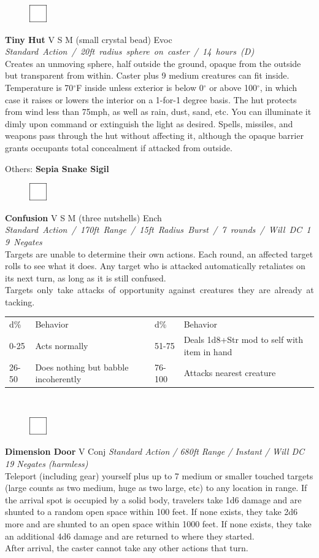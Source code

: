 \documentclass[letterpaper]{article}
\newcommand{\colhead}[0]{\footnotesize\itshape}
\newcommand{\e}[1]{\emph{#1}}
\newcommand{\B}[1]{\textbf{#1}}
\newcommand{\spell}[7]{
\begin{figure}
\vspace{-13pt}
\ifstrequal{#2}{Full}{  \includegraphics[width=2em]{Checkbox-Full}}{
\ifstrequal{#2}{Scroll}{\includegraphics[width=2em]{Checkbox-S}}{
                        \includegraphics[width=2em]{Checkbox}}}
\ifstrequal{#7}{}{\vspace{-1em}}{\vspace{#7}}
\end{figure}
 \B{#1} #3 {
    \ifstrequal{#4}{Conj}{\color{Plum}Conj}{%
    \ifstrequal{#4}{Divin}{\color{YellowOrange}Divin}{%
    \ifstrequal{#4}{Ench}{\color{VioletRed}Ench}{%
    \ifstrequal{#4}{Trans}{\color{LimeGreen}Trans}{%
    \ifstrequal{#4}{Evoc}{\color{RedOrange}Evoc}{%
    \ifstrequal{#4}{Illu}{\color{ProcessBlue}Illu}{%
    \ifstrequal{#4}{Abjur}{\color{CadetBlue}Abjur}{%
    \ifstrequal{#4}{Necro}{\color{Red}Necro}{%
}}}}}}}}}
{\footnotesize \e{#5}} \\
#6
}
\begin{document}
\spell{Tiny Hut}{}{V S M (small crystal bead)}{Evoc}{\mbox{Standard Action / 20ft radius sphere on caster /  14 hours (D)}}{%
Creates an unmoving sphere, half outside the ground, opaque from the outside but transparent from within.  Caster plus 9 medium creatures can fit inside.  Temperature is 70$^{\circ}$F inside unless exterior is below 0$^{\circ}$ or above 100$^{\circ}$, in which case it raises or lowers the interior on a 1-for-1 degree basis.  The hut protects from wind less than 75mph, as well as rain, dust, sand, etc.  You can illuminate it dimly upon command or extinguish the light as desired.  Spells, missiles, and weapons pass through the hut without affecting it, although the opaque barrier grants occupants total concealment if attacked from outside.}{2em} %

\begin{adjustwidth}{3em}{0em}
    Others: \B{Sepia Snake Sigil}\\
\end{adjustwidth}

\spell{Confusion}{}{V S M (three nutshells)}{Ench}{\mbox{Standard Action / 170ft Range / 15ft Radius Burst / 7 rounds / Will DC 19 Negates}}{
    Targets are unable to determine their own actions.  Each round, an affected target rolls to see what it does. Any target who is attacked automatically retaliates on its next turn, as long as it is still confused. \mbox{Targets only take attacks of opportunity against creatures they are already attacking.}\\
    \begin{tabu} to \textwidth{X[1] X[4] X[1] X[4]}
        \rowfont{\colhead}d\% & Behavior & d\% & Behavior\\
        \rowfont{\footnotesize}0-25 & Acts normally & 51-75 & Deals 1d8+Str mod to self with item in hand\\
        \rowfont{\footnotesize}26-50 & Does nothing but babble incoherently & 76-100 & Attacks nearest creature\\
    \end{tabu}}{2em}\\ %

\spell{Dimension Door}{}{V}{Conj}{Standard Action / 680ft Range / Instant / Will DC 19 Negates (harmless)}{
Teleport (including gear) yourself plus up to 7 medium or smaller touched targets (large counts as two medium, huge as two large, etc) to any location in range. If the arrival spot is occupied by a solid body, travelers take 1d6 damage and are shunted to a random open space within 100 feet.  If none exists, they take 2d6 more and are shunted to an open space within 1000 feet.  If none exists, they take an additional 4d6 damage and are returned to where they started.\\After arrival, the caster cannot take any other actions that turn.}{2em}\\[-1em]
\end{document}
